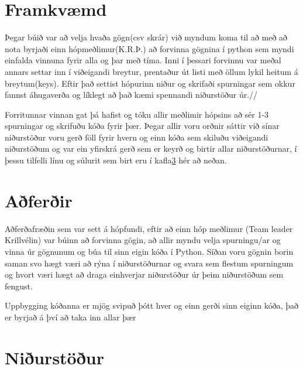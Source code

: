 \documentclass[12pt, svn, draft]{rureport}
\begin{document}
\section{Framkvæmd}

Þegar búið var að velja hvaða gögn(csv skrár) við myndum koma til að með að nota byrjaði einn hópmeðlimur(K.R.Þ.) að forvinna gögnina í python sem myndi einfalda vinnuna fyrir alla og þar með tíma. Inni í þessari forvinnu var meðal annars settar inn í viðeigandi breytur, prentaður út listi með öllum lykil heitum á breytum(keys). Eftir það settist hópurinn niður og skrifaði spurningar sem okkur fannst áhugaverða og líklegt að það kæmi spennandi niðurstöður úr.//

Forritunnar vinnan gat þá hafist og tóku allir meðlimir hópsins að sér 1-3 spurningar og skrifuðu kóða fyrir þær. Þegar allir voru orðnir sáttir við sínar niðurstöður voru gerð föll fyrir hvern og einn kóða sem skiluðu viðeigandi niðurstöðum og var ein yfirskrá gerð sem er keyrð og birtir allar niðurstöðurnar, í þessu tilfelli línu og súlurit sem birt eru í kafla\ref{nidurstodur} hér að neðan.

\section{Aðferðir}

Aðferðafræðin sem var sett á hópfundi, eftir að einn hóp meðlimur (Team leader Krillvélin) var búinn að forvinna gögin, að allir myndu velja spurningu/ar og vinna úr gögnunum og búa til sinn eigin kóða í Python. Síðan voru gögnin borin saman svo hægt væri að rýna í niðurstöðurnar og svara sem flestum spurningum og hvort væri hægt að draga einhverjar niðurstöður úr þeim niðurstöðum sem fengust.

Uppbygging kóðanna er mjög svipuð þótt hver og einn gerði sinn eiginn kóða, það er byrjað á því að taka inn allar þær 
 



\section{Niðurstöður}\label{nidurstodur}
\end{document}
